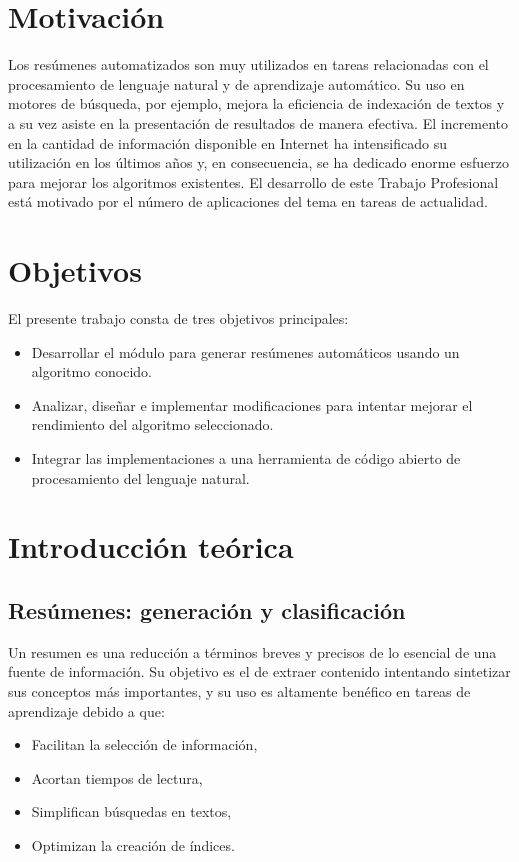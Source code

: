 \documentclass[a4paper]{article}
\begin{document}
\newpage
\section{Motivación}
Los resúmenes automatizados son muy utilizados en tareas relacionadas con el procesamiento de lenguaje natural y de aprendizaje automático. Su uso en motores de búsqueda, por ejemplo, mejora la eficiencia de indexación de textos y a su vez asiste en la presentación de resultados de manera efectiva. El incremento en la cantidad de información disponible en Internet ha intensificado su utilización en los últimos años y, en consecuencia, se ha dedicado enorme esfuerzo para mejorar los algoritmos existentes. 
El desarrollo de este Trabajo Profesional está motivado por el número de aplicaciones del tema en tareas de actualidad.


\section{Objetivos}
El presente trabajo consta de tres objetivos principales:
\begin{itemize}
\item Desarrollar el módulo para generar resúmenes automáticos usando un algoritmo conocido.
\item Analizar, diseñar e implementar modificaciones para intentar mejorar el rendimiento del algoritmo seleccionado.
\item Integrar las implementaciones a una herramienta de código abierto de procesamiento del lenguaje natural.
\end{itemize}

\section{Introducción teórica}

\subsection{Resúmenes: generación y clasificación}
Un resumen es una reducción a términos breves y precisos de lo esencial de una fuente de información. Su objetivo es el de extraer contenido intentando sintetizar sus conceptos más importantes, y su uso es altamente benéfico en tareas de aprendizaje debido a que:
\begin{itemize}
\item Facilitan la selección de información,
\item Acortan tiempos de lectura,
\item Simplifican búsquedas en textos,
\item Optimizan la creación de índices.
\end{itemize}
\end{document}
